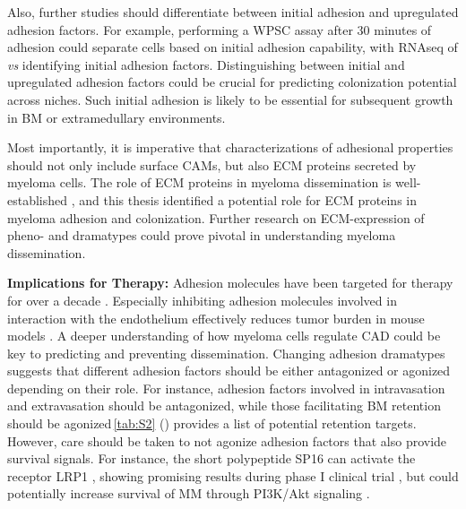 Also, further studies should differentiate between initial adhesion and
upregulated adhesion factors. For example, performing a \ac{WPSC} assay after 30
minutes of adhesion could separate \INA cells based on initial adhesion
capability, with RNAseq of \nMAina \textit{vs} \MAina identifying initial
adhesion factors. Distinguishing between initial and upregulated adhesion
factors could be crucial for predicting colonization potential across niches.
Such initial adhesion is likely to be essential for subsequent growth in \ac{BM}
or extramedullary environments.

Most importantly, it is imperative that characterizations of adhesional
properties should not only include surface \acp{CAM}, but also \ac{ECM} proteins
secreted by myeloma cells. The role of \ac{ECM} proteins in myeloma
dissemination is well-established \cite{ibraheemBMMSCsderivedECMModifies2019},
and this thesis identified a potential role for \ac{ECM} proteins in myeloma
adhesion and colonization. Further research on \ac{ECM}-expression of pheno- and
dramatypes could prove pivotal in understanding myeloma dissemination.


\textbf{Implications for Therapy:}
Adhesion molecules have been targeted for therapy for over a decade
\cite{nairChapterSixEmerging2012, neriTargetingAdhesionMolecules2012}.
Especially inhibiting adhesion molecules involved in interaction with the
endothelium effectively reduces tumor burden in mouse models
\cite{asosinghUniquePathwayHoming2001a,
      mrozikTherapeuticTargetingNcadherin2015}. A deeper understanding of how myeloma
cells regulate \ac{CAD} could be key to predicting and preventing dissemination.
Changing adhesion dramatypes suggests that different adhesion factors should be
either antagonized or agonized depending on their role. For instance, adhesion
factors involved in intravasation and extravasation should be antagonized, while
those facilitating BM retention%
\footterm{\footretentiveadhesionfactors}{\label{foot:retentiveadhesionfactors}}%
should be agonized\,\textemdash\autoref{tab:S2} () provides a
list of potential retention targets. However, care should be taken to not
agonize adhesion factors that also provide survival signals. For instance, the
short polypeptide SP16 can activate the receptor LRP1 ,
showing promising results during phase I clinical trial
\cite{wohlfordPhaseClinicalTrial2021}, but could potentially increase survival
of MM through PI3K/Akt signaling \cite{potereDevelopingLRP1Agonists2019,
      heinemannInhibitingPI3KAKT2022}.

